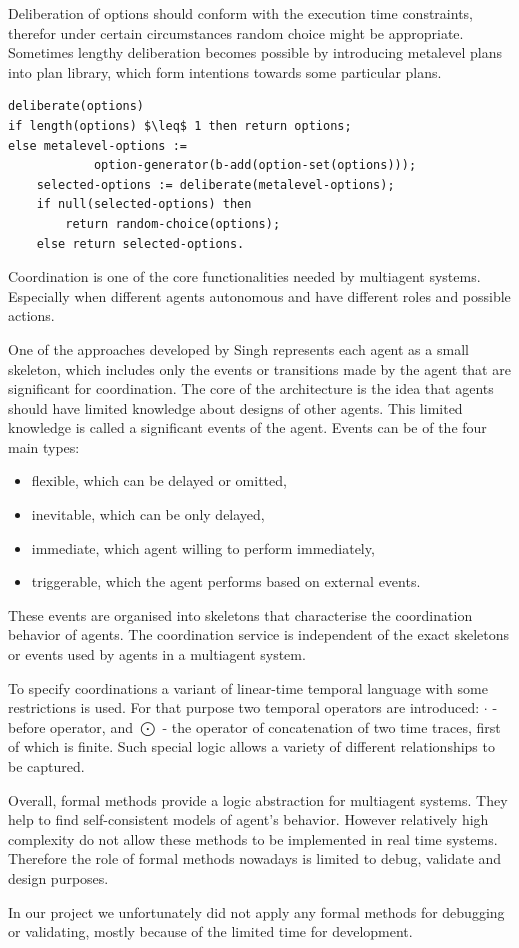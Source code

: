 Deliberation of options should conform with the execution time constraints, therefor under certain circumstances random choice might be appropriate. Sometimes lengthy deliberation becomes possible by introducing metalevel plans into plan library, which form intentions towards some particular plans.
%
\begin{lstlisting}[mathescape]
deliberate(options)
if length(options) $\leq$ 1 then return options;
else metalevel-options :=
            option-generator(b-add(option-set(options)));
    selected-options := deliberate(metalevel-options);
    if null(selected-options) then
        return random-choice(options);
    else return selected-options.
\end{lstlisting}

Coordination is one of the core functionalities needed by multiagent systems. Especially when different agents autonomous and have different roles and possible actions.

One of the approaches developed by Singh \cite{Singh_97} represents each agent as a small skeleton, which includes only the events or
transitions made by the agent that are significant for coordination. The core of the architecture is the idea that agents should have limited knowledge about designs of other agents. This limited knowledge is called a significant events of the agent. Events can be of the four main types:
\begin{itemize}
  \item flexible, which can be delayed or omitted,
  \item inevitable, which can be only delayed,
  \item immediate, which agent willing to perform immediately,
  \item triggerable, which the agent performs based on external events.
\end{itemize}
These events are organised into skeletons that characterise the coordination behavior of agents. The coordination service is independent of the exact skeletons or events used by agents in a multiagent system.

To specify coordinations a variant of linear-time temporal language with some restrictions is used. For that purpose two temporal operators are introduced: $\cdot$ - before operator, and $\bigodot$ - the operator of concatenation of two time traces, first of which is finite. Such special logic allows a variety of different relationships to be captured.

Overall, formal methods provide a logic abstraction for multiagent systems. They help to find self-consistent models of agent's behavior. However relatively high complexity do not allow these methods to be implemented in real time systems. Therefore the role of formal methods nowadays is limited to debug, validate and design purposes.

In our project we unfortunately did not apply any formal methods for debugging or validating, mostly because of the limited time for development.
